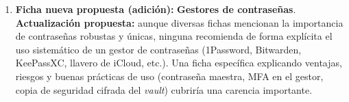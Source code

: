 \begin{enumerate}[leftmargin=*]
    \item \textbf{Ficha nueva propuesta (adición):} \textbf{Gestores de contraseñas}. \\
    \textbf{Actualización propuesta:} aunque diversas fichas mencionan la importancia de contraseñas robustas y únicas, ninguna recomienda de forma explícita el uso sistemático de un gestor de contraseñas (1Password, Bitwarden, KeePassXC, llavero de iCloud, etc.). Una ficha específica explicando ventajas, riesgos y buenas prácticas de uso (contraseña maestra, MFA en el gestor, copia de seguridad cifrada del \textit{vault}) cubriría una carencia importante.
\end{enumerate}
